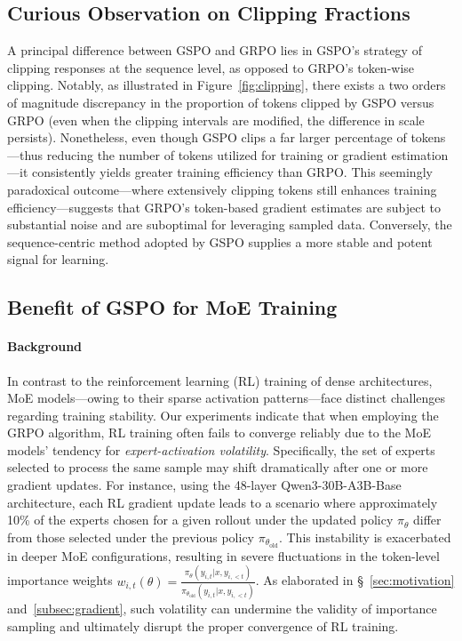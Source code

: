 \subsection{Curious Observation on Clipping Fractions}

A principal difference between GSPO and GRPO lies in GSPO’s strategy of clipping responses at the sequence level, as opposed to GRPO’s token-wise clipping. Notably, as illustrated in Figure~\ref{fig:clipping}, there exists a two orders of magnitude discrepancy in the proportion of tokens clipped by GSPO versus GRPO (even when the clipping intervals are modified, the difference in scale persists). Nonetheless, even though GSPO clips a far larger percentage of tokens—thus reducing the number of tokens utilized for training or gradient estimation—it consistently yields greater training efficiency than GRPO. This seemingly paradoxical outcome—where extensively clipping tokens still enhances training efficiency—suggests that GRPO’s token-based gradient estimates are subject to substantial noise and are suboptimal for leveraging sampled data. Conversely, the sequence-centric method adopted by GSPO supplies a more stable and potent signal for learning.

\subsection{Benefit of GSPO for MoE Training}
\label{subsec:routing_replay}

\paragraph{Background}
In contrast to the reinforcement learning (RL) training of dense architectures, MoE models—owing to their sparse activation patterns—face distinct challenges regarding training stability. Our experiments indicate that when employing the GRPO algorithm, RL training often fails to converge reliably due to the MoE models' tendency for \textit{expert-activation volatility}. Specifically, the set of experts selected to process the same sample may shift dramatically after one or more gradient updates. For instance, using the 48-layer Qwen3-30B-A3B-Base architecture, each RL gradient update leads to a scenario where approximately 10\% of the experts chosen for a given rollout under the updated policy $\pi_{\theta}$ differ from those selected under the previous policy $\pi_{\theta_\text{old}}$. This instability is exacerbated in deeper MoE configurations, resulting in severe fluctuations in the token-level importance weights $w_{i,t}(\theta) = \frac{ \pi_{\theta} (y_{i,t} | x, y_{i,<t}) }{ \pi_{\theta_\text{old}} (y_{i,t} | x,y_{i,<t})}$. As elaborated in \S~\ref{sec:motivation} and~\ref{subsec:gradient}, such volatility can undermine the validity of importance sampling and ultimately disrupt the proper convergence of RL training.

